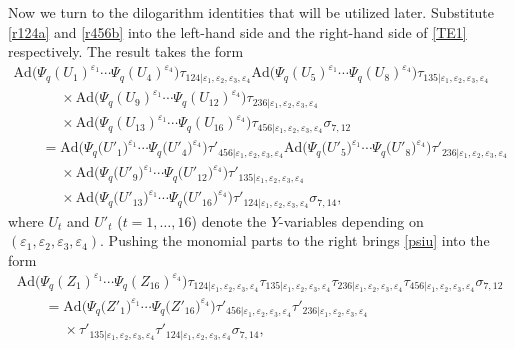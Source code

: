 \documentclass[11pt]{article}
\numberwithin{equation}{section}
\numberwithin{equation}{section}
\begin{document}
Now we turn to the dilogarithm identities that will be utilized later.
Substitute \eqref{r124a} and \eqref{r456b} into the
left-hand side and the right-hand side of \eqref{TE1} respectively.
The result takes the form
\begin{gather}
\mathrm{Ad}\bigl(
\Psi_q(U_1)^{\varepsilon_1} \dotsm \Psi_q(U_4)^{\varepsilon_4}\bigr)
\tau_{124| \varepsilon_1, \varepsilon_2, \varepsilon_3, \varepsilon_4}
\mathrm{Ad}\bigl(
\Psi_q(U_5)^{\varepsilon_1} \dotsm \Psi_q(U_8)^{\varepsilon_4}\bigr)
\tau_{135| \varepsilon_1, \varepsilon_2, \varepsilon_3, \varepsilon_4}\nonumber
\\
\phantom{\qquad =}{}\times
\mathrm{Ad}\bigl(
\Psi_q(U_9)^{\varepsilon_1} \dotsm \Psi_q(U_{12})^{\varepsilon_4}\bigr)
\tau_{236 | \varepsilon_1, \varepsilon_2, \varepsilon_3, \varepsilon_4}\nonumber
\\
\phantom{\qquad =}{}\times
\mathrm{Ad}\bigl(
\Psi_q(U_{13})^{\varepsilon_1} \dotsm \Psi_q(U_{16})^{\varepsilon_4}\bigr)
\tau_{456| \varepsilon_1, \varepsilon_2, \varepsilon_3, \varepsilon_4}\sigma_{7,12}\nonumber
\\
\qquad {}=
\mathrm{Ad}\bigl(
\Psi_q\bigl(U'_1\bigr)^{\varepsilon_1} \dotsm \Psi_q\bigl(U'_4\bigr)^{\varepsilon_4}\bigr)
\tau'_{456| \varepsilon_1, \varepsilon_2, \varepsilon_3, \varepsilon_4}
\mathrm{Ad}\bigl(
\Psi_q\bigl(U'_5\bigr)^{\varepsilon_1} \dotsm \Psi_q\bigl(U'_8\bigr)^{\varepsilon_4}\bigr)
\tau'_{236| \varepsilon_1, \varepsilon_2, \varepsilon_3, \varepsilon_4}\nonumber
\\
\phantom{\qquad =}{} \times
\mathrm{Ad}\bigl(
\Psi_q\bigl(U'_9\bigr)^{\varepsilon_1} \dotsm \Psi_q\bigl(U'_{12}\bigr)^{\varepsilon_4}\bigr)
\tau'_{135| \varepsilon_1, \varepsilon_2, \varepsilon_3, \varepsilon_4}\nonumber
\\
\phantom{\qquad =}{} \times
\mathrm{Ad}\bigl(
\Psi_q\bigl(U'_{13}\bigr)^{\varepsilon_1} \dotsm \Psi_q\bigl(U'_{16}\bigr)^{\varepsilon_4}\bigr)
\tau'_{124| \varepsilon_1, \varepsilon_2, \varepsilon_3, \varepsilon_4}\sigma_{7,14},\label{psiu}
\end{gather}
where $U_t$ and $U'_t$ ($t=1, \dots, 16$) denote the $Y$-variables
depending on
$(\varepsilon_1, \varepsilon_2, \varepsilon_3, \varepsilon_4)$.
%
Pushing the monomial parts to the right brings \eqref{psiu} into the form
\begin{gather}
\mathrm{Ad}\bigl(\Psi_q(Z_1)^{\varepsilon_1}\dotsm \Psi_q(Z_{16})^{\varepsilon_{4}}\bigr)
\tau_{124|\varepsilon_1,\varepsilon_2,\varepsilon_3,\varepsilon_4}
\tau_{135|\varepsilon_1,\varepsilon_2,\varepsilon_3,\varepsilon_4}
\tau_{236|\varepsilon_1,\varepsilon_2,\varepsilon_3,\varepsilon_4}
\tau_{456|\varepsilon_1,\varepsilon_2,\varepsilon_3,\varepsilon_4}\sigma_{7,12}\nonumber
\\
\qquad=
\mathrm{Ad}\bigl(\Psi_q\bigl(Z'_1\bigr)^{\varepsilon_1}\dotsm \Psi_q\bigl(Z'_{16}\bigr)^{\varepsilon_{4}}\bigr)
\tau'_{456|\varepsilon_1,\varepsilon_2,\varepsilon_3,\varepsilon_4}
\tau'_{236|\varepsilon_1,\varepsilon_2,\varepsilon_3,\varepsilon_4}\nonumber
\\
\phantom{\qquad=}{}\times
\tau'_{135|\varepsilon_1,\varepsilon_2,\varepsilon_3,\varepsilon_4}
\tau'_{124|\varepsilon_1,\varepsilon_2,\varepsilon_3,\varepsilon_4}\sigma_{7,14},\label{zteq}
\end{gather}
\end{document}
